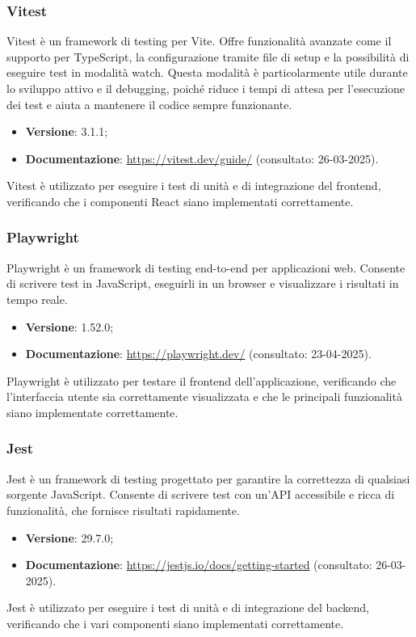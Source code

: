 \subsubsection{Vitest}
Vitest è un framework di testing per Vite. Offre funzionalità avanzate come il
supporto per TypeScript, la configurazione tramite file di setup e la
possibilità di eseguire test in modalità watch. Questa modalità è particolarmente utile
durante lo sviluppo attivo e il debugging, poiché riduce i tempi di attesa per
l'esecuzione dei test e aiuta a mantenere il codice sempre funzionante.
\begin{itemize}
    \item \textbf{Versione}: 3.1.1;
    \item \textbf{Documentazione}: \url{https://vitest.dev/guide/} (consultato:
          26-03-2025).
\end{itemize}
Vitest è utilizzato per eseguire i test di unità e di integrazione del frontend,
verificando che i componenti React siano implementati correttamente.

\subsubsection{Playwright}
Playwright è un framework di testing end-to-end per applicazioni web. Consente di
scrivere test in JavaScript, eseguirli in un browser e visualizzare i
risultati in tempo reale.
\begin{itemize}
    \item \textbf{Versione}: 1.52.0;
    \item \textbf{Documentazione}: \url{https://playwright.dev/} (consultato:
          23-04-2025).
\end{itemize}
Playwright è utilizzato per testare il frontend dell'applicazione, verificando che
l'interfaccia utente sia correttamente visualizzata e che le principali funzionalità
siano implementate correttamente.

\subsubsection{Jest}
Jest è un framework di testing progettato per garantire la correttezza di
qualsiasi sorgente JavaScript. Consente di scrivere test con un'API
accessibile e ricca di funzionalità, che fornisce risultati rapidamente.
\begin{itemize}
    \item \textbf{Versione}: 29.7.0;
    \item \textbf{Documentazione}: \url{https://jestjs.io/docs/getting-started} (consultato:
          26-03-2025).
\end{itemize}
Jest è utilizzato per eseguire i test di unità e di integrazione del backend,
verificando che i vari componenti siano implementati correttamente.